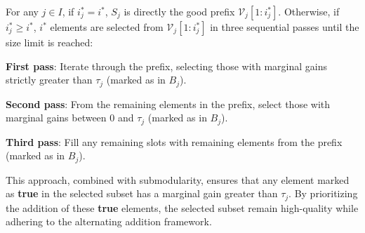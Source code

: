 For any $j \in I$, if $i_j^* = i^*$, $S_j$ is directly the good prefix $\mathcal V_j[1:i_j^*]$.
Otherwise, if $i_j^* \ge i^*$,
$i^*$ elements are selected from $\mathcal V_j[1:i_j^*]$ in three sequential passes until the size limit is reached:

\textbf{First pass}: Iterate through the prefix,
selecting those with marginal gains strictly greater than
$\tau_j$ (marked as  in $B_j$).

\textbf{Second pass}: 
From the remaining elements in the prefix, select those 
with marginal gains between $0$ and $\tau_j$
(marked as  in $B_j$).

\textbf{Third pass}: Fill any remaining slots with remaining elements from the prefix (marked as  in $B_j$).

This approach, combined with submodularity, 
ensures that any element marked as \textbf{true} in the selected subset has a marginal gain greater than $\tau_j$.
By prioritizing the addition of these \textbf{true} elements,
the selected subset remain high-quality while adhering to the alternating
addition framework.









